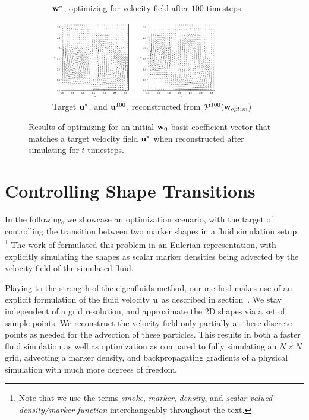 \begin{figure}
\begin{subfigure}{\textwidth}
{    $\vb{w}^*$, optimizing for velocity field after $100$ timesteps\\}
    \label{fig:100-timesteps-coeffs}
  \end{subfigure}\par\medskip
  \begin{subfigure}{\textwidth}
    \centering
    \includegraphics[width=0.8\textwidth]{figures/finding-initial-velocities/t_100_velocities.png}
    \caption{Target $\vb{u}^*$, and $\vb{u}^{100}$, reconstructed from
      $\mathcal{P}^{100}(\vb{w}_{optim})$}
    \label{fig:100-timesteps-vel}
  \end{subfigure}
  \caption{Results of optimizing for an initial $\vb{w}_0$ basis coefficient
    vector that matches a target velocity field $\vb{u}^*$ when reconstructed
    after simulating for $t$ timesteps.
  }
  \label{fig:matching-velocities}
\end{figure}

\section{Controlling Shape Transitions}
\label{section:controlling-shape-transitions}
In the following, we showcase an optimization scenario, with the target of
controlling the transition between two marker shapes in a fluid simulation
setup. 
\footnote{Note that we use the terms \textit{smoke}, \textit{marker},
\textit{density}, and \textit{scalar valued density/marker function}
interchangeably throughout the text.}
The work of \cite{holl2019pdecontrol} formulated this problem in an
Eulerian representation, with explicitly simulating the shapes as scalar marker
densities being advected by the velocity field of the simulated fluid. 

Playing to the strength of the eigenfluids method, our method makes use of
an explicit formulation of the fluid velocity $\vb{u}$ as described in
section~. We stay independent of a grid resolution, and
approximate the 2D shapes via a set of sample points. We reconstruct the
velocity field only partially at these discrete points as needed for the
advection of these particles. This results in both a faster fluid simulation as
well as optimization as compared to fully simulating an $N\times N$ grid,
advecting a marker density, and backpropagating gradients of a physical
simulation with much more degrees of freedom.

